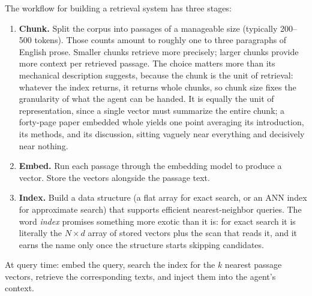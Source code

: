 The workflow for building a retrieval system has three stages:
\begin{enumerate}
\item \textbf{Chunk.} Split the corpus into passages of a manageable size (typically 200--500 tokens).
Those counts amount to roughly one to three paragraphs of English prose.
Smaller chunks retrieve more precisely; larger chunks provide more context per retrieved passage.
The choice matters more than its mechanical description suggests, because the chunk is the unit of retrieval: whatever the index returns, it returns whole chunks, so chunk size fixes the granularity of what the agent can be handed.
It is equally the unit of representation, since a single vector must summarize the entire chunk; a forty-page paper embedded whole yields one point averaging its introduction, its methods, and its discussion, sitting vaguely near everything and decisively near nothing.

\item \textbf{Embed.} Run each passage through the embedding model to produce a vector.
Store the vectors alongside the passage text.

\item \textbf{Index.} Build a data structure (a flat array for exact search, or an ANN index for approximate search) that supports efficient nearest-neighbor queries.
The word \emph{index} promises something more exotic than it is: for exact search it is literally the $N \times d$ array of stored vectors plus the scan that reads it, and it earns the name only once the structure starts skipping candidates.
\end{enumerate}

At query time: embed the query, search the index for the $k$ nearest passage vectors, retrieve the corresponding texts, and inject them into the agent's context.

